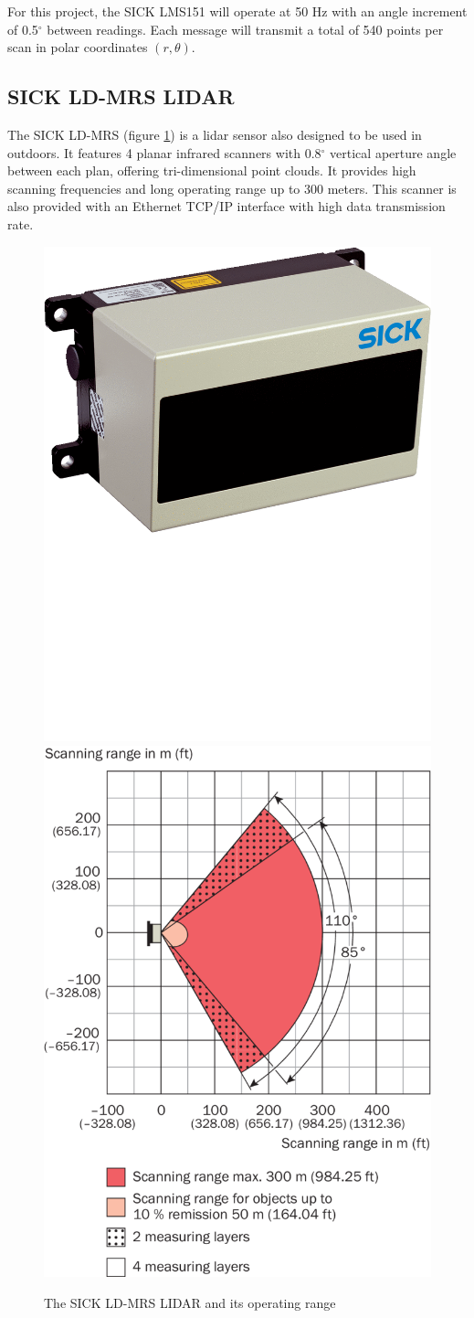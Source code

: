 For this project, the SICK LMS151 will operate at 50 Hz with an angle increment of 0.5$^{\circ}$ between readings. Each message will transmit a total of 540 points per scan in polar coordinates $(r,\theta)$. \cite{SICK}

\subsection{SICK LD-MRS LIDAR}

The SICK LD-MRS (figure \ref{fig:sickldmrs}) is a \gls{lidar} sensor also designed to be used in outdoors. It features 4 planar infrared scanners with 0.8$^{\circ}$ vertical aperture angle between each plan, offering tri-dimensional point clouds. It provides high scanning frequencies and long operating range up to 300 meters. This scanner is also provided with an Ethernet TCP/IP interface with high data transmission rate. \cite{SICKa}

\begin{figure}[htp]
	
	\centering
	\hfill
	\includegraphics[width=.4\textwidth]{capexp/imgs/sickldmrs}\hfill
	\includegraphics[width=.5\textwidth]{capexp/imgs/sickldmrs2}\hfill
	
	\caption{The SICK LD-MRS LIDAR and its operating range}
	\label{fig:sickldmrs}
	
\end{figure}

